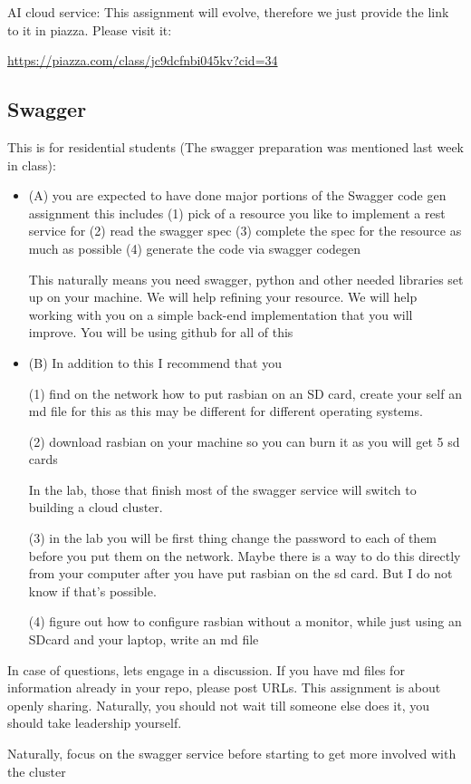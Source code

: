 \begin{exercise}

AI cloud service: This assignment will evolve, therefore we just
provide the link to it in piazza. Please visit it:

\url{https://piazza.com/class/jc9dcfnbi045kv?cid=34}
\end{exercise}

\subsection{Swagger}
\begin{exercise}
This is for residential students (The swagger preparation was mentioned last week in class):
 \begin{itemize}
\item (A) you are expected to have done major portions of the Swagger code gen assignment this includes
\subitem (1) pick of a resource you like to implement a rest service for
\subitem (2) read the swagger spec
\subitem (3) complete the spec for the resource as much as possible
\subitem (4) generate the code via swagger codegen
 
This naturally means you need swagger, python and other needed libraries set up on your machine. We will help refining your resource. We will help working with you on a simple back-end implementation that you will improve. You will be using github for all of this
\smallskip
\item (B) In addition to this I recommend that you
 
\subitem (1) find on the network how to put rasbian on an SD card, create your self an md file for this as this may be different for different operating systems.
 
\subitem (2) download rasbian on your machine so you can burn it as you will get 5 sd cards
 
In the lab, those that finish most of the swagger service will switch to building a cloud cluster.
 
\subitem (3) in the lab you will be first thing change the password to each of them before you put them on the network. Maybe there is a way to do this directly from your computer after you have put rasbian on the sd card. But I do not know if that's possible.
 
\subitem (4) figure out how to configure rasbian without a monitor, while just using an SDcard and your laptop, write an md file

 \end{itemize}
 
In case of questions, lets engage in a discussion. If you have md files for information already in your repo, please post URLs. This assignment is about openly sharing. Naturally, you should not wait till someone else does it, you should take leadership yourself.
 
Naturally, focus on the swagger service before starting to get more involved with the cluster
\end{exercise}

